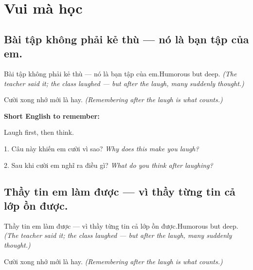 \chapter{Vui mà học}


\section{Bài tập không phải kẻ thù — nó là bạn tập của em.}
\begin{truyen}{Bài tập không phải kẻ thù — nó là bạn tập của em.}{Humorous but deep.}
\textit{(The teacher said it; the class laughed — but after the laugh, many suddenly thought.)}
\end{truyen}

\begin{baihoc}
Cười xong nhớ mới là hay.
\textit{(Remembering after the laugh is what counts.)}
\end{baihoc}

\begin{ghinhoanh}
\textbf{Short English to remember:}

Laugh first, then think.

\end{ghinhoanh}

\begin{tuhocnhanh}
1. Câu này khiến em cười vì sao? \textit{Why does this make you laugh?}

2. Sau khi cười em nghĩ ra điều gì? \textit{What do you think after laughing?}
\end{tuhocnhanh}
\ngancach


\section{Thầy tin em làm được — vì thầy từng tin cả lớp ồn được.}
\begin{truyen}{Thầy tin em làm được — vì thầy từng tin cả lớp ồn được.}{Humorous but deep.}
\textit{(The teacher said it; the class laughed — but after the laugh, many suddenly thought.)}
\end{truyen}

\begin{baihoc}
Cười xong nhớ mới là hay.
\textit{(Remembering after the laugh is what counts.)}
\end{baihoc}

